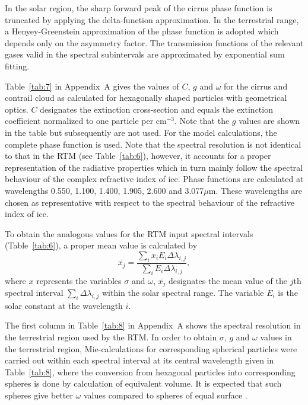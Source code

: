\documentclass[agp]{svjour}
\begin{document}
In the solar region, the sharp forward peak of the cirrus phase function
is truncated by applying the delta-function approximation. In the
terrestrial range, a Henyey-Greenstein approximation of the phase
function is adopted which depends only on the asymmetry factor. The
transmission functions of the relevant gases valid in the spectral
subintervals are approximated by exponential sum fitting.

Table~\ref{tab:7} in Appendix~A gives the values of $C$, $g$ and
$\omega$ for the cirrus and contrail cloud as calculated for hexagonally
shaped particles with geometrical optics. $C$ designates the extinction
cross-section and equals the extinction coefficient normalized to one
particle per cm$^{-3}$. Note that the $g$ values are shown in the table
but subsequently are not used. For the model calculations, the complete
phase function is used. Note that the spectral resolution is not
identical to that in the RTM (see Table~\ref{tab:6}), however, it accounts
for a proper representation of the radiative properties which in turn
mainly follow the spectral behaviour of the complex refractive index of
ice. Phase functions are calculated at wavelengths 0.550, 1.100, 1.400,
1.905, 2.600 and 3.077$\mu$m. These wavelengths are chosen as
representative with respect to the spectral behaviour of the refractive
index of ice.

To obtain the analogous values for the RTM input spectral intervals
(Table~\ref{tab:6}), a proper mean value is calculated by
\begin{equation}
\overline{x_j} = \frac{\sum_{i} x_i E_i \Delta \lambda_{i,j}}{\sum_{i} E_i
\Delta \lambda_{i,j}},
\label{eq:1}
\end{equation}
where $x$ represents the variables $\sigma$ and $\omega$,
$\overline{x_j}$ designates the mean value of the $j$th spectral
interval $\sum_{i} \Delta \lambda_{i,j}$ within the solar spectral
range. The variable $E_i$ is the solar constant at the wavelength $i$.

The first column in Table~\ref{tab:8} in Appendix~A shows the spectral
resolution in the terrestrial region used by the RTM. In order to obtain
$\sigma$, $g$ and $\omega$ values in the terrestrial region,
Mie-calculations for corresponding spherical particles were carried out
within each spectral interval at its central wavelength given in
Table~\ref{tab:8}, where the conversion from hexagonal particles into
corresponding spheres is done by calculation of equivalent volume. It is
expected that such spheres give better $\omega$ values compared to
spheres of equal surface \citep{Ta89}.
\end{document}
